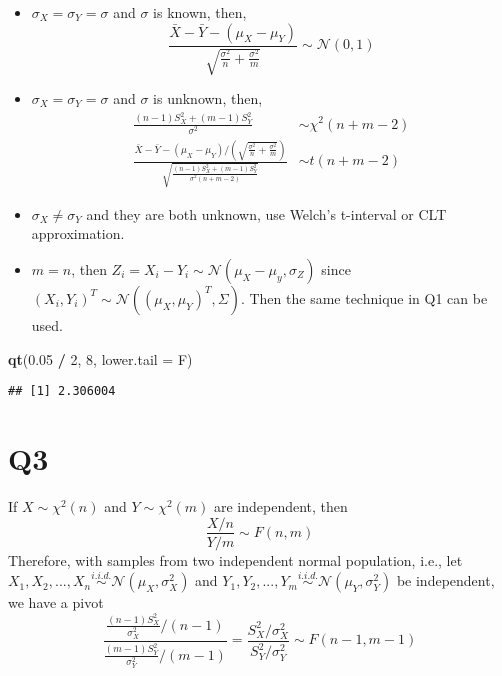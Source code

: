 \documentclass[
]{book}
\newenvironment{Shaded}{\begin{snugshade}}{\end{snugshade}}
\newcommand{\DataTypeTok}[1]{\textcolor[rgb]{0.13,0.29,0.53}{#1}}
\newcommand{\DecValTok}[1]{\textcolor[rgb]{0.00,0.00,0.81}{#1}}
\newcommand{\FloatTok}[1]{\textcolor[rgb]{0.00,0.00,0.81}{#1}}
\newcommand{\KeywordTok}[1]{\textcolor[rgb]{0.13,0.29,0.53}{\textbf{#1}}}
\newcommand{\NormalTok}[1]{#1}
\newcommand{\OperatorTok}[1]{\textcolor[rgb]{0.81,0.36,0.00}{\textbf{#1}}}
\newcommand{\StringTok}[1]{\textcolor[rgb]{0.31,0.60,0.02}{#1}}
\theoremstyle{definition}
\theoremstyle{definition}
\theoremstyle{definition}
\theoremstyle{remark}
\begin{document}
\begin{itemize}
\item
  \(\sigma_X=\sigma_Y=\sigma\) and \(\sigma\) is known, then,
  \begin{equation}
  \frac{\bar X - \bar Y - (\mu_X-\mu_Y)}{\sqrt{\frac{\sigma^2}{n}+\frac{\sigma^2}{m}}}\sim \mathcal{N}(0,1)
  \end{equation}
\item
  \(\sigma_X=\sigma_Y=\sigma\) and \(\sigma\) is unknown, then,
  \begin{align}
  \frac{(n-1)S_X^2+(m-1)S_Y^2}{\sigma^2}&\sim \chi^2(n+m-2)\\
  \frac{\bar X - \bar Y-(\mu_X-\mu_Y)/\left(\sqrt{\frac{\sigma^2}{n}+\frac{\sigma^2}{m}}\right)}{\sqrt{\frac{(n-1)S_X^2+(m-1)S_Y^2}{\sigma^2(n+m-2)}}}&\sim t(n+m-2)
  \end{align}
\item
  \(\sigma_X\neq\sigma_Y\) and they are both unknown, use Welch's t-interval or CLT approximation.
\item
  \(m=n\), then \(Z_i = X_i-Y_i\sim\mathcal{N}(\mu_X-\mu_y,\sigma_Z)\) since \((X_i,Y_i)^T\sim \mathcal{N}\left((\mu_X,\mu_Y)^T, \Sigma\right)\). Then the same technique in Q1 can be used.
\end{itemize}

\begin{Shaded}
\begin{Highlighting}[]
\KeywordTok{qt}\NormalTok{(}\FloatTok{0.05} \OperatorTok{/}\StringTok{ }\DecValTok{2}\NormalTok{, }\DecValTok{8}\NormalTok{, }\DataTypeTok{lower.tail =}\NormalTok{ F)}
\end{Highlighting}
\end{Shaded}

\begin{verbatim}
## [1] 2.306004
\end{verbatim}

\hypertarget{q3}{%
\section{Q3}\label{q3}}

If \(X\sim \chi^2(n)\) and \(Y\sim\chi^2(m)\) are independent, then
\[
\frac{X/n}{Y/m}\sim F(n, m)
\]
Therefore, with samples from two independent normal population, i.e., let \(X_1,X_2,...,X_n\stackrel{i.i.d.}{\sim}\mathcal{N}(\mu_X,\sigma^2_X)\) and \(Y_1,Y_2,...,Y_m\stackrel{i.i.d.}{\sim}\mathcal{N}(\mu_Y,\sigma^2_Y)\) be independent, we have a pivot
\begin{equation}
\frac{\frac{(n-1)S_X^2}{\sigma^2_X} / (n-1)}{\frac{(m-1)S_Y^2}{\sigma^2_Y}/(m-1)} = \frac{S_X^2/\sigma^2_X}{S_Y^2/\sigma^2_Y}\sim F(n-1, m-1)
\end{equation}
\end{document}
